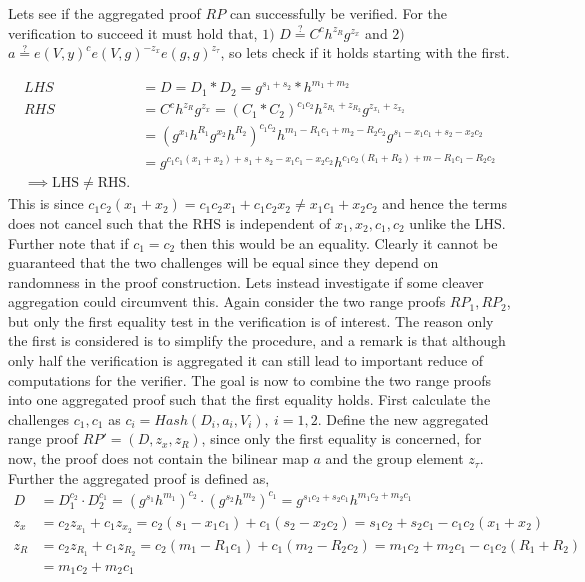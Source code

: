 
Lets see if the  aggregated proof $RP$ can successfully be verified. For the verification to succeed it must hold that, $1)$ $D\overset{?}{=} C^ch^{z_R}g^{z_x}$ and $2)$ $ a \overset{?}{=} e(V,y)^ce(V,g)^{-z_x}e(g,g)^{z_\tau}$, so lets check if it holds starting with the first.

\begin{align*}
LHS &= D = D_1*D_2 = g^{s_1+s_2}*h^{m_1+m_2} \\
RHS &= C^ch^{z_R}g^{z_x} = (C_1*C_2)^{c_1c_2}h^{z_{R_1}+z_{R_2}}g^{z_{x_1}+z_{x_2}} \\ 
&=(g^{x_1}h^{R_1}g^{x_2}h^{R_2}) ^{c_1c_2}  h^{m_1-R_1c_1+m_2-R_2c_2} g^{s_1- x_1c_1+s_2-x_2c_2} \\
&= g^{c_1c_1(x_1+x_2)+s_1+s_2-x_1c_1-x_2c_2}h^{c_1c_2(R_1+R_2)+m-R_1c_1-R_2c_2} \\
\implies \text{LHS}\neq \text{RHS}.
\end{align*}
This is since $ c_1c_2(x_1+x_2) = c_1c_2x_1+c_1c_2x_2 \neq x_1c_1 + x_2c_2$ and hence the terms does not cancel such that the RHS is independent of $x_1,x_2,c_1,c_2$ unlike the LHS. Further note that if $c_1=c_2$ then this would be an equality. Clearly it cannot be guaranteed that the two challenges will be equal since they depend on randomness in the proof construction. Lets instead investigate if some cleaver aggregation could circumvent this. Again consider the two range proofs $RP_1,RP_2$, but only the first equality test in the verification  is of interest. The reason only the first is considered is to simplify the procedure, and a remark is that although only half the verification is aggregated it can still lead to important reduce of computations for the verifier. The goal is now to combine the two range proofs into one aggregated proof such that the first equality holds. First calculate the challenges $c_1,c_1$ as $c_i =Hash(D_i,a_i,V_i),\:i=1,2$.
Define the new aggregated range proof  $RP' =(D,z_x,z_R)$, since only the first equality is concerned, for now, the proof does not contain the bilinear map $a$ and the group element $z_{\tau}$. Further the aggregated proof is defined as, 
\begin{align*}
D &= D_1^{c_2}\cdot D_2^{c_1} = (g^{s_1}h^{m_1}) ^{c_2} \cdot (g^{s_2}h^{m_2}) ^{c_1}  =g^{s_1c_2+s_2c_1}h^{m_1c_2+m_2c_1} \\
z_x &= c_2z_{x_1} +c_1 z_{x_2} = c_2(s_1-x_1c_1)  + c_1(s_2-x_2c_2) = s_1c_2 + s_2c_1 -c_1c_2(x_1+x_2)\\
z_R &= c_2z_{R_1} +c_1 z_{R_2} = c_2(m_1-R_1c_1)  + c_1(m_2-R_2c_2) = m_1c_2 + m_2c_1 -c_1c_2(R_1+R_2)\\
&= m_1c_2 + m_2c_1\\
\end{align*}
